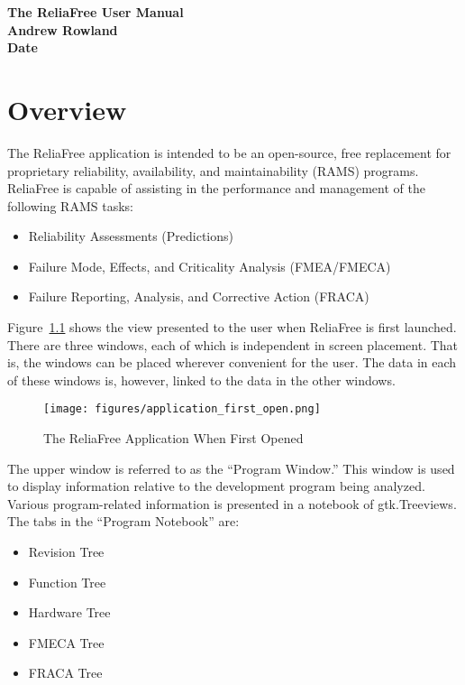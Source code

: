 \documentclass[11pt, 12pt, twoside, onecolumn]{book}
\begin{document}
\begin{titlepage}
\centering
{\linespread{1.3} \Huge \textbf{The ReliaFree User Manual}} \\
{\linespread{1.3} \large \textbf{Andrew Rowland}} \\
{\large \textbf{Date}}
\end{titlepage}

\tableofcontents
\newpage

\chapter{\textbf{Overview}}

\noindent The ReliaFree application is intended to be an open-source, free replacement for proprietary reliability, availability, and maintainability (RAMS) programs.  ReliaFree is capable of assisting in the performance and management of the following RAMS tasks:

	\begin{itemize}
		\item Reliability Assessments (Predictions)
		\item Failure Mode, Effects, and Criticality Analysis (FMEA/FMECA)
		\item Failure Reporting, Analysis, and Corrective Action (FRACA)
	\end{itemize}

\noindent Figure~\ref{application\_first\_open} shows the view presented to the user when ReliaFree is first launched.  There are three windows, each of which is independent in screen placement.  That is, the windows can be placed wherever convenient for the user.  The data in each of these windows is, however, linked to the data in the other windows.

	\begin{figure}[ht!]
		\centering
		\texttt{[image: figures/application\_first\_open.png]}
		\caption{The ReliaFree Application When First Opened}\label{application\_first\_open}
	\end{figure}

\noindent The upper window is referred to as the ``Program Window.''  This window is used to display information relative to the development program being analyzed.  Various program-related information is presented in a notebook of gtk.Treeviews.  The tabs in the ``Program Notebook'' are:

	\begin{itemize}
		\item Revision Tree
		\item Function Tree
		\item Hardware Tree
		\item FMECA Tree
		\item FRACA Tree
	\end{itemize}
\end{document}
